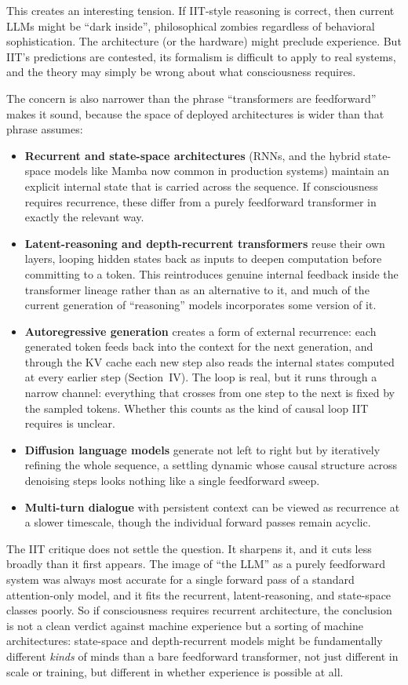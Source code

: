 \documentclass[11pt,letterpaper]{article}
\begin{document}
This creates an interesting tension. If IIT-style reasoning is correct, then current LLMs might be ``dark inside'', philosophical zombies regardless of behavioral sophistication. The architecture (or the hardware) might preclude experience. But IIT's predictions are contested, its formalism is difficult to apply to real systems, and the theory may simply be wrong about what consciousness requires.

The concern is also narrower than the phrase ``transformers are feedforward'' makes it sound, because the space of deployed architectures is wider than that phrase assumes:
\begin{itemize}
  \item \textbf{Recurrent and state-space architectures} (RNNs, and the hybrid state-space models like Mamba now common in production systems) maintain an explicit internal state that is carried across the sequence. If consciousness requires recurrence, these differ from a purely feedforward transformer in exactly the relevant way.
  \item \textbf{Latent-reasoning and depth-recurrent transformers} reuse their own layers, looping hidden states back as inputs to deepen computation before committing to a token. This reintroduces genuine internal feedback inside the transformer lineage rather than as an alternative to it, and much of the current generation of ``reasoning'' models incorporates some version of it.
  \item \textbf{Autoregressive generation} creates a form of external recurrence: each generated token feeds back into the context for the next generation, and through the KV cache each new step also reads the internal states computed at every earlier step (Section~IV). The loop is real, but it runs through a narrow channel: everything that crosses from one step to the next is fixed by the sampled tokens. Whether this counts as the kind of causal loop IIT requires is unclear.
  \item \textbf{Diffusion language models} generate not left to right but by iteratively refining the whole sequence, a settling dynamic whose causal structure across denoising steps looks nothing like a single feedforward sweep.
  \item \textbf{Multi-turn dialogue} with persistent context can be viewed as recurrence at a slower timescale, though the individual forward passes remain acyclic.
\end{itemize}

The IIT critique does not settle the question. It sharpens it, and it cuts less broadly than it first appears. The image of ``the LLM'' as a purely feedforward system was always most accurate for a single forward pass of a standard attention-only model, and it fits the recurrent, latent-reasoning, and state-space classes poorly. So if consciousness requires recurrent architecture, the conclusion is not a clean verdict against machine experience but a sorting of machine architectures: state-space and depth-recurrent models might be fundamentally different \emph{kinds} of minds than a bare feedforward transformer, not just different in scale or training, but different in whether experience is possible at all.
\end{document}

